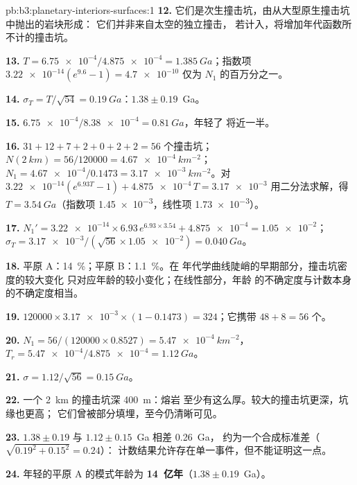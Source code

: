 \begin{solution}{pb:b3:planetary-interiors-surfaces:1}
\textbf{12.} 它们是次生撞击坑，由从大型原生撞击坑中抛出的岩块形成：
它们并非来自太空的独立撞击，
若计入，将增加年代函数所不计的撞击坑。

\textbf{13.} $T = \num{6.75e-4}/\num{4.875e-4} = \qty{1.385}{Ga}$；指数项
$\num{3.22e-14}(e^{9.6} - 1) = \num{4.7e-10}$ 仅为
$N_1$ 的百万分之一。

\textbf{14.} $\sigma_T = T/\sqrt{54} = \qty{0.19}{Ga}$：$1.38 \pm 0.19$~Ga。

\textbf{15.} $\num{6.75e-4}/\num{8.38e-4} = \qty{0.81}{Ga}$，年轻了
将近一半。

\textbf{16.} $31 + 12 + 7 + 2 + 0 + 2 + 2 = 56$ 个撞击坑；$N(\qty{2}{km}) =
56/120000 = \qty{4.67e-4}{km^{-2}}$；$N_1 = \num{4.67e-4}/0.1473 =
\qty{3.17e-3}{km^{-2}}$。对 $\num{3.22e-14}(e^{6.93T} - 1) +
\num{4.875e-4}\,T = \num{3.17e-3}$ 用二分法求解，得 $T = \qty{3.54}{Ga}$（指数项
\num{1.45e-3}，线性项 \num{1.73e-3}）。

\textbf{17.} $N_1' = \num{3.22e-14}\times6.93\,e^{6.93\times3.54} +
\num{4.875e-4} = \num{1.05e-2}$；$\sigma_T = \num{3.17e-3}/(\sqrt{56}\times
\num{1.05e-2}) = \qty{0.040}{Ga}$。

\textbf{18.} 平原 A：\qty{14}{\percent}；平原 B：\qty{1.1}{\percent}。在
年代学曲线陡峭的早期部分，撞击坑密度的较大变化
只对应年龄的较小变化；在线性部分，年龄
的不确定度与计数本身的不确定度相当。

\textbf{19.} $120000\times\num{3.17e-3}\times(1 - 0.1473) = 324$；它携带
$48 + 8 = 56$ 个。

\textbf{20.} $N_1 = 56/(120000\times0.8527) = \qty{5.47e-4}{km^{-2}}$，
$T_r = \num{5.47e-4}/\num{4.875e-4} = \qty{1.12}{Ga}$。

\textbf{21.} $\sigma = 1.12/\sqrt{56} = \qty{0.15}{Ga}$。

\textbf{22.} 一个 \qty{2}{km} 的撞击坑深 \qty{400}{m}：熔岩
至少有这么厚。较大的撞击坑更深，坑缘也更高；
它们曾被部分填埋，至今仍清晰可见。

\textbf{23.} $1.38 \pm 0.19$ 与 $1.12 \pm 0.15$~Ga 相差 \qty{0.26}{Ga}，
约为一个合成标准差（$\sqrt{0.19^2 + 0.15^2} = 0.24$）：
计数结果允许存在单一事件，但不能证明这一点。

\textbf{24.} 年轻的平原 A 的模式年龄为
\textbf{14~亿年}（$1.38 \pm 0.19$~Ga）。
\end{solution}
